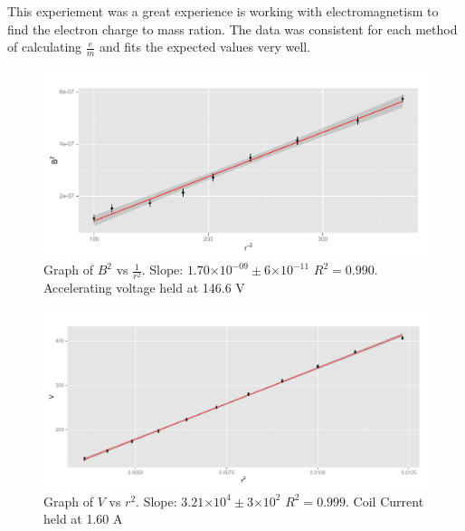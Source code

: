 \documentclass[twocolumn,secnumarabic,amssymb, nobibnotes, aps, pra]{revtex4}
\providecommand{\e}[1]{\ensuremath{\times 10^{#1}}}
\begin{document}
This experiement was a great experience is working with electromagnetism to find the electron charge to mass ration.  The data was consistent for each method of calculating $\frac{e}{m}$ and fits the expected values very well.

\begin{figure}[b]
\begin{center}
\includegraphics[scale=.8]{plot1.pdf}
\end{center}
\caption{Graph of $B^2$ vs $\frac{1}{r^2}$.  Slope: $1.70\e{-09} \pm 6\e{-11}$ $R^2 = 0.990$. Accelerating voltage held at 146.6 V}
\label{fig:one}
\end{figure}

\begin{figure}[b]
\begin{center}
\includegraphics[scale=.7]{plot2.pdf}
\end{center}
\caption{Graph of $V$ vs $r^2$.  Slope: $3.21\e{4} \pm 3\e{2}$ $R^2 = 0.999$.  Coil Current held at 1.60 A}
\label{fig:two}
\end{figure}
\end{document}
